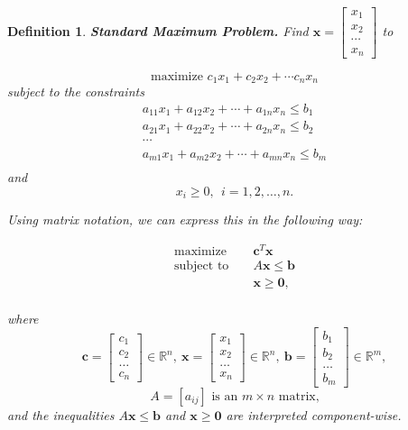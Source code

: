 \documentclass[letterpaper,10pt]{article}
\newcommand{\bvec}[1]{\ensuremath{\mathbf{#1}}}
\newtheorem{df}{Definition}[section]
\begin{document}
\begin{df}{\bf Standard Maximum Problem.}  Find $\displaystyle \bvec{x}=\left[\begin{array}{c}x_1\\x_2\\\cdots\\x_n\end{array}\right]$ to

$$\text{maximize }c_1x_1+c_2x_2+\cdots c_nx_n$$ subject to the constraints
\begin{eqnarray*}
a_{11}x_1+a_{12}x_2+\cdots+a_{1n}x_n\leq b_1\\
a_{21}x_1+a_{22}x_2+\cdots+a_{2n}x_n\leq b_2\\
\cdots\\
a_{m1}x_1+a_{m2}x_2+\cdots+a_{mn}x_n\leq b_m\\
\end{eqnarray*}
 and $$x_i\geq 0,~~i=1,2,\ldots,n.$$

\noindent Using matrix notation, we can express this in the following way:

\begin{eqnarray*}
\text{maximize }&&\bvec{c}^T\bvec{x}\\
\text{subject to }&&A\bvec{x}\leq \bvec{b}\\
&&\bvec{x}\geq \bvec{0},\\
\end{eqnarray*}

\noindent where $$\bvec{c}=\left[\begin{array}{c}c_1\\c_2\\\ldots\\c_n\end{array}\right]\in\mathbb{R}^n,~\bvec{x}=\left[\begin{array}{c}x_1\\x_2\\\ldots\\x_n\end{array}\right]\in\mathbb{R}^n,~\bvec{b}=\left[\begin{array}{c}b_1\\b_2\\\ldots\\b_m\end{array}\right]\in\mathbb{R}^m,$$ $$A=\left[a_{ij}\right]\text{ is an }m\times n\text{ matrix,}$$ and the inequalities $A\bvec{x}\leq\bvec{b}$ and $\bvec{x}\geq\bvec{0}$ are interpreted component-wise.

\end{df}
\end{document}
